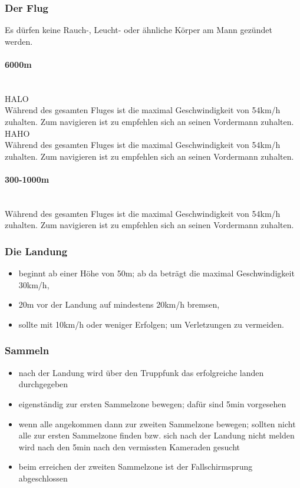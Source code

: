 \subsubsection{Der Flug}
Es dürfen keine Rauch-, Leucht- oder ähnliche Körper am Mann gezündet werden. \\
\paragraph{6000m} \ \\
	HALO	\\
	Während des gesamten Fluges ist die maximal Geschwindigkeit von 54km/h zuhalten. Zum navigieren ist zu empfehlen sich an seinen Vordermann zuhalten. \\
	HAHO \\
	Während des gesamten Fluges ist die maximal Geschwindigkeit von 54km/h zuhalten. Zum navigieren ist zu empfehlen sich an seinen Vordermann zuhalten. \\

\paragraph{300-1000m} \ \\
	Während des gesamten Fluges ist die maximal Geschwindigkeit von 54km/h zuhalten. Zum navigieren ist zu empfehlen sich an seinen Vordermann zuhalten. \\

\subsubsection{Die Landung}
	\begin{itemize}
		\item beginnt ab einer Höhe von 50m; ab da beträgt die maximal Geschwindigkeit 30km/h,
		\item 20m vor der Landung auf mindestens 20km/h bremsen,
		\item sollte mit 10km/h oder weniger Erfolgen; um Verletzungen zu vermeiden.
	\end{itemize}

\subsubsection{Sammeln}
	\begin{itemize}
		\item nach der Landung wird über den Truppfunk das erfolgreiche landen durchgegeben
		\item eigenständig zur ersten Sammelzone bewegen; dafür sind 5min vorgesehen
		\item wenn alle angekommen dann zur zweiten Sammelzone bewegen; sollten nicht alle zur ersten Sammelzone finden bzw. sich nach der Landung nicht melden wird nach den 5min nach den vermissten Kameraden gesucht
		\item beim erreichen der zweiten Sammelzone ist der Fallschirmsprung abgeschlossen
	\end{itemize}
	